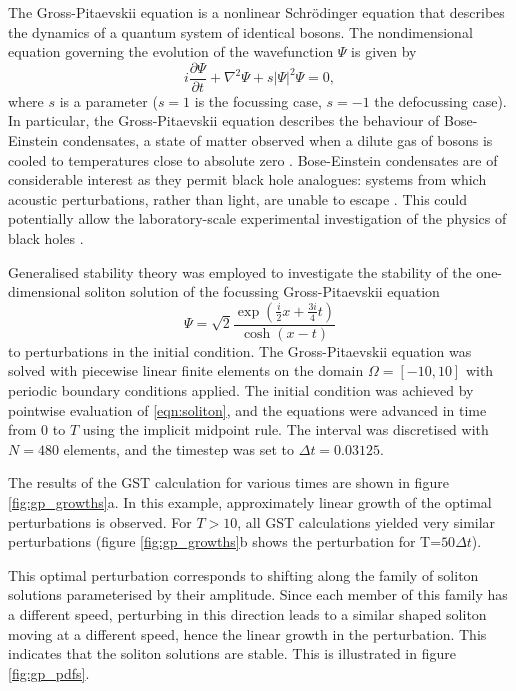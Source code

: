 \documentclass{siamltex}
\begin{document}
The Gross-Pitaevskii equation \cite{gross1961,pitaevskii1961} is a nonlinear Schr\"odinger equation that describes the dynamics
of a quantum system of identical bosons. The nondimensional equation governing the evolution of the wavefunction $\Psi$ is given by
\begin{equation}
  i\frac{\partial \Psi}{\partial t} + \nabla^2\Psi + s|\Psi|^2\Psi = 0,
\end{equation}
where $s$ is a parameter ($s = 1$ is the focussing case, $s = -1$ the defocussing case). In particular, the Gross-Pitaevskii equation
describes the behaviour of Bose-Einstein condensates, a state of matter observed when a dilute gas of bosons is cooled to temperatures
close to absolute zero \cite{bose1924,einstein1924}. Bose-Einstein condensates are of considerable interest as they permit
black hole analogues: systems from which acoustic perturbations, rather than light, are unable to escape \cite{unruh1981}. This
could potentially allow the laboratory-scale experimental investigation of the physics of black holes \cite{farrell2008,lahav2010}.

Generalised stability theory was employed to investigate the stability of the one-dimensional soliton solution of the focussing Gross-Pitaevskii
equation
\begin{equation} \label{eqn:soliton}
\Psi = \sqrt{2} \frac{\exp{(\frac{i}{2} x + \frac{3i}{4}t)} }{\cosh{(x - t)}}
\end{equation}
to perturbations in the initial condition. The Gross-Pitaevskii equation was solved with piecewise linear finite elements on the domain $\Omega = [-10, 10]$
with periodic boundary conditions applied. The initial condition was achieved by pointwise evaluation of \eqref{eqn:soliton}, and the equations were
advanced in time from $0$ to $T$ using the implicit midpoint rule. The interval was discretised with
$N = 480$ elements, and the timestep was set to $\Delta t = 0.03125$.

The results of the GST calculation for various times are shown in
figure \ref{fig:gp_growths}a. In this example, approximately linear
growth of the optimal perturbations is observed. For $T>10$, all GST
calculations yielded very similar perturbations (figure \ref{fig:gp_growths}b shows the
perturbation for T=$50\Delta t$). 

This optimal perturbation corresponds to
shifting along the family of soliton solutions parameterised by their amplitude. Since each
member of this family has a different speed, perturbing in this
direction leads to a similar shaped soliton moving at a different
speed, hence the linear growth in the perturbation. This indicates that the soliton
solutions are stable. This is illustrated in figure \ref{fig:gp_pdfs}.
\end{document}
